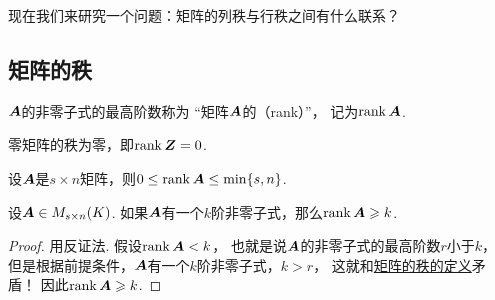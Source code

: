 现在我们来研究一个问题：矩阵的列秩与行秩之间有什么联系？

\subsection{矩阵的秩}
\begin{definition}\label{definition:线性方程组.矩阵的秩的定义}
\(\boldsymbol{A}\)的非零子式的最高阶数称为
“矩阵\(\boldsymbol{A}\)的（rank）”，
记为\(\rank\boldsymbol{A}\).
\end{definition}

\begin{property}\label{theorem:线性方程组.矩阵的秩的性质1}
零矩阵的秩为零，即\(\rank\boldsymbol{Z} = 0\).
\end{property}

\begin{property}\label{theorem:线性方程组.矩阵的秩的性质2}
设\(\boldsymbol{A}\)是\(s \times n\)矩阵，则\(0 \leq \rank\boldsymbol{A} \leq \min\{s,n\}\).
\end{property}

\begin{theorem}
设\(\boldsymbol{A}\in M_{s \times n}(K)\).
如果\(\boldsymbol{A}\)有一个\(k\)阶非零子式，那么\(\rank\boldsymbol{A}\geqslant k\).
\begin{proof}
用反证法.
假设\(\rank\boldsymbol{A}<k\)，
也就是说\(\boldsymbol{A}\)的非零子式的最高阶数\(r\)小于\(k\)，
但是根据前提条件，\(\boldsymbol{A}\)有一个\(k\)阶非零子式，\(k>r\)，
这就和\hyperref[definition:线性方程组.矩阵的秩的定义]{矩阵的秩的定义}矛盾！
因此\(\rank\boldsymbol{A}\geqslant k\).
\end{proof}
\end{theorem}

